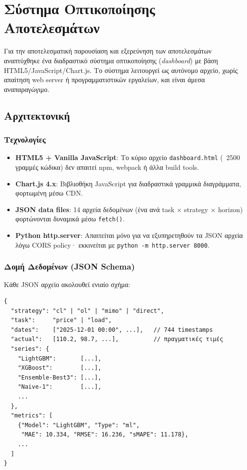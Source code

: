 \chapter{Σύστημα Οπτικοποίησης Αποτελεσμάτων}
\label{ch:dashboard}

Για την αποτελεσματική παρουσίαση και εξερεύνηση των αποτελεσμάτων αναπτύχθηκε
ένα διαδραστικό σύστημα οπτικοποίησης (\textit{dashboard}) με βάση
HTML5/JavaScript/Chart.js. Το σύστημα λειτουργεί ως αυτόνομο αρχείο, χωρίς
απαίτηση web server ή προγραμματιστικών εργαλείων, και είναι άμεσα
αναπαραγώγιμο.

\section{Αρχιτεκτονική}
\label{sec:dash_arch}

\subsection*{Τεχνολογίες}

\begin{itemize}
    \item \textbf{HTML5 + Vanilla JavaScript}: Το κύριο αρχείο \texttt{dashboard.html}
    (~2500 γραμμές κώδικα) δεν απαιτεί npm, webpack ή άλλα build tools.
    \item \textbf{Chart.js 4.x}: Βιβλιοθήκη JavaScript για διαδραστικά
    γραμμικά διαγράμματα, φορτωμένη μέσω CDN.
    \item \textbf{JSON data files}: 14 αρχεία δεδομένων (ένα ανά
    task × strategy × horizon) φορτώνονται δυναμικά μέσω \texttt{fetch()}.
    \item \textbf{Python http.server}: Απαιτείται μόνο για να εξυπηρετηθούν
    τα JSON αρχεία λόγω CORS policy· εκκινείται με
    \texttt{python -m http.server 8000}.
\end{itemize}

\subsection*{Δομή Δεδομένων (JSON Schema)}

Κάθε JSON αρχείο ακολουθεί ενιαίο σχήμα:
\begin{lstlisting}[language={}]
{
  "strategy": "cl" | "ol" | "mimo" | "direct",
  "task":     "price" | "load",
  "dates":    ["2025-12-01 00:00", ...],   // 744 timestamps
  "actual":   [110.2, 98.7, ...],          // πραγματικές τιμές
  "series": {
    "LightGBM":       [...],
    "XGBoost":        [...],
    "Ensemble-Best3": [...],
    "Naive-1":        [...],
    ...
  },
  "metrics": [
    {"Model": "LightGBM", "Type": "ml",
     "MAE": 10.334, "RMSE": 16.236, "sMAPE": 11.178},
    ...
  ]
}
\end{lstlisting}

